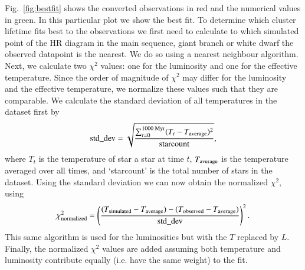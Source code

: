 \documentclass{aa}
\begin{document}
Fig.~\ref{fig:bestfit} shows the converted observations in red and the numerical values in green. In this particular plot we show the best fit. To determine which cluster lifetime fits best to the observations we first need to calculate to which simulated point of the HR diagram in the main sequence, giant branch or white dwarf the observed datapoint is the nearest. We do so using a nearest neighbour algorithm. Next, we calculate two $\chi^2$ values: one for the luminosity and one for the effective temperature. Since the order of magnitude of $\chi^2$ may differ for the luminosity and the effective temperature, we normalize these values such that they are comparable. We calculate the standard deviation of all temperatures in the dataset first by
\begin{eqnarray}
    \text{std\_dev} = \sqrt{\frac{\sum_{t=0}^{1000 \text{ Myr}} (T_t - T_{\rm average})^2}{\text{starcount}}}, \label{eq:stdev} 
\end{eqnarray}where $T_t$ is the temperature of star a star at time $t$, $T_{\rm average}$ is the temperature averaged over all times, and `starcount' is the total number of stars in the dataset. Using the standard deviation we can now obtain the normalized $\chi^2$, using
\begin{eqnarray}
    \chi^2_{\rm normalized} = \left( \frac{(T_{\rm simulated} - T_{\rm average}) - (T_{\rm observed} - T_{\rm average})}{\text{std\_dev}} \right)^2.
\end{eqnarray}
This same algorithm is used for the luminosities but with the $T$ replaced by $L$. Finally, the normalized $\chi^2$ values are added assuming both temperature and luminosity contribute equally (i.e. have the same weight) to the fit.
\end{document}
